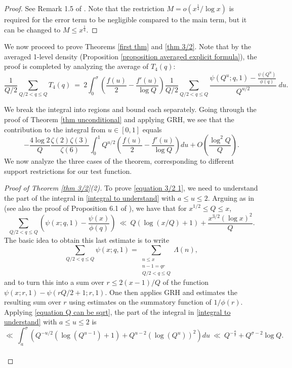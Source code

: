 \documentclass[12pt,reqno]{amsart}
\numberwithin{equation}{section}
\theoremstyle{plain}
\begin{document}
\begin{proof}
See Remark 1.5 of \cite{fiorilli}. Note that the restriction $M=o(x^{\frac 14}/\log x)$ is required for the error term to be negligible compared to the main term, but it can be changed to $M\leq x^{\frac 14}$.

\end{proof}

We now proceed to prove Theorems \ref{first thm} and \ref{thm 3/2}. Note that by the averaged 1-level density (Proposition \ref{proposition averaged explicit formula}), the proof is completed by analyzing the average of $T_4(q)$:
\begin{equation} \frac1{Q/2} \sum_{Q/2<q\leq Q}T_4(q)\ = \ 2 \int_0^{\sigma} \left(\frac {f(u)}2 -\frac {f'(u)}{\log Q}\right)\frac1{Q/2}\sum_{Q/2<q\leq Q}\frac{\psi(Q^u;q,1)-\frac{\psi(Q^u)}{\phi(q)}}{Q^{u/2}}\ du.
 \label{integral to understand}
\end{equation}

We break the integral into regions and bound each separately. Going through the proof of Theorem \ref{thm unconditional} and applying GRH, we see that the contribution to the integral from $u \in [0, 1]$ equals
\begin{equation}- \frac{4\log 2}Q \frac{\zeta(2)\zeta(3)}{\zeta(6)} \int_0^{1} Q^{u/2}\left(\frac {f(u)}2 -\frac {f'(u)}{\log Q}\right) du
+O\left( \frac{\log^2 Q}Q\right).
\label{part of the integral u<1}\end{equation}
We now analyze the three cases of the theorem, corresponding to different support restrictions for our test function.

\begin{proof}[Proof of Theorem \ref{thm 3/2}(2)] To prove \eqref{equation 3/2 1}, we need to understand the part of the integral in \eqref{integral to understand} with $a\leq u \leq 2$. Arguing as in \cite{FG} (see also the proof of Proposition 6.1 of \cite{fiorilli}), we have that for $x^{1/2} \leq Q \leq x$,
\begin{equation} \sum_{Q/2<q\leq Q} \left(\psi(x;q,1)-\frac{\psi(x)}{\phi(q)} \right)\ \ll\ Q \left(\log (x/Q)+1\right) + \frac{x^{3/2} (\log x)^2}Q.
\label{equation Q can be sqrt}
\end{equation}
The basic idea to obtain this last estimate is to write
$$ \sum_{Q/2<q\leq Q} \psi(x;q,1) = \sum_{\substack{ n\leq x \\ n-1 = qr \\ Q/2<q\leq Q }} \Lambda(n),$$
and to turn this into a sum over $r\leq 2(x-1)/Q$ of the function $\psi(x;r,1)-\psi(rQ/2+1;r,1)$. One then applies GRH and estimates the resulting sum over $r$ using estimates on the summatory function of $1/\phi(r)$. Applying \eqref{equation Q can be sqrt}, the part of the integral in \eqref{integral to understand} with $a\leq u \leq 2$ is
\begin{equation} \ll\ \int_{a}^{\sigma} \left( Q^{-u/2} (\log (Q^{u-1}) +1)  + Q^{u-2} (\log (Q^u))^2\right)du\ \ll\ Q^{-\frac a2} + Q^{\sigma-2} \log Q. \label{integral between a and sigma}\end{equation} \ \\

\end{proof}
\end{document}
